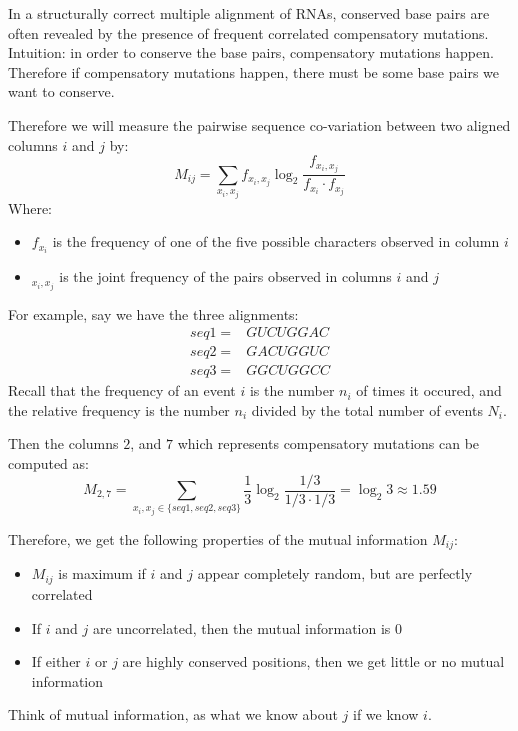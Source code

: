 \begin{figure}[H]
\begin{subfigure}{.5\textwidth}
        \end{subfigure}
    \end{figure}
    
    In a structurally correct multiple alignment of RNAs, conserved base pairs 
    are often revealed by the presence of frequent correlated compensatory 
    mutations. Intuition: in order to conserve the base pairs, compensatory 
    mutations happen. Therefore if compensatory mutations happen, there must be 
    some base pairs we want to conserve.
    
    Therefore we will measure the pairwise sequence co-variation between two 
    aligned columns $i$ and $j$ by:
    \begin{equation*}
        M_{ij}=\sum_{x_i,x_j}f_{x_i,x_j} \log_2\frac{f_{x_i,x_j}}{f_{x_i} \cdot 
        f_{x_j}}
    \end{equation*}
    Where:
    \begin{itemize}
        \item $f_{x_i}$ is the frequency of one of the five possible characters 
        observed in column $i$
        \item $_{x_i,x_j}$ is the joint frequency of the pairs observed in 
        columns $i$ and $j$
    \end{itemize}
    
    For example, say we have the three alignments:
    \begin{align*}
        seq1 = &GUCUGGAC\\
        seq2 = &GACUGGUC\\
        seq3 = &GGCUGGCC
    \end{align*}
    Recall that the frequency of an event $i$ is the number $n_i$ of times it 
    occured, and the relative frequency is the number $n_i$ divided by the 
    total number of events $N_i$.
    
    Then the columns $2$, and $7$ which represents compensatory mutations can 
    be computed as:
    \begin{equation*}
        M_{2,7}= \sum_{x_i,x_j \in \{seq1, seq2, seq3\}} \frac{1}{3} \log_2 
        \frac{1/3}{1/3 \cdot 1/3} = \log_2 3\approx 1.59
    \end{equation*}
    
    Therefore, we get the following properties of the mutual information 
    $M_{ij}$:
    \begin{itemize}
        \item $M_{ij}$ is maximum if $i$ and $j$ appear completely random, but 
        are perfectly correlated
        \item If $i$ and $j$ are uncorrelated, then the mutual information is 
        $0$
        \item If either $i$ or $j$ are highly conserved positions, then we get 
        little or no mutual information
    \end{itemize}
    Think of mutual information, as what we know about $j$ if we know $i$.
    
